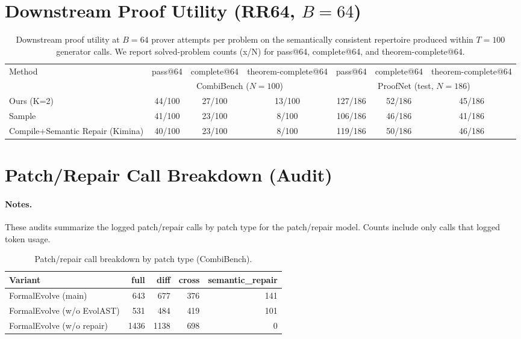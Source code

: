 \documentclass[10pt]{article}
\begin{document}
\section{Downstream Proof Utility (RR64, $B{=}64$)}

\begin{table}[h]
  \centering
  \caption{Downstream proof utility at $B=64$ prover attempts per problem on the semantically consistent repertoire produced within $T=100$ generator calls. We report solved-problem counts (x/N) for pass@64, complete@64, and theorem-complete@64.}
  \label{tab:supp-proof-64}
  \scriptsize
  \begin{tabular}{lccc|ccc}
    \toprule
    Method & pass@64 & complete@64 & theorem-complete@64 & pass@64 & complete@64 & theorem-complete@64 \\
     & \multicolumn{3}{c}{CombiBench ($N=100$)} & \multicolumn{3}{c}{ProofNet (test, $N=186$)} \\
    \midrule
    Ours (K=2) & 44/100 & 27/100 & 13/100 & 127/186 & 52/186 & 45/186 \\
    Sample & 41/100 & 23/100 & 8/100 & 106/186 & 46/186 & 41/186 \\
    Compile+Semantic Repair (Kimina) & 40/100 & 23/100 & 8/100 & 119/186 & 50/186 & 46/186 \\
    \bottomrule
  \end{tabular}
\end{table}

\section{Patch/Repair Call Breakdown (Audit)}

\paragraph{Notes.}
These audits summarize the logged patch/repair calls by patch type for the patch/repair model. Counts include only calls that logged token usage.

\begin{table}[h]
  \centering
  \caption{Patch/repair call breakdown by patch type (CombiBench).}
  \label{tab:supp-patch-breakdown-cb}
  \scriptsize
  \begin{tabular}{lrrrr}
    \toprule
    Variant & full & diff & cross & semantic\_repair \\
    \midrule
    FormalEvolve (main) & 643 & 677 & 376 & 141 \\
    FormalEvolve (w/o EvolAST) & 531 & 484 & 419 & 101 \\
    FormalEvolve (w/o repair) & 1436 & 1138 & 698 & 0 \\
    \bottomrule
  \end{tabular}
\end{table}
\end{document}
